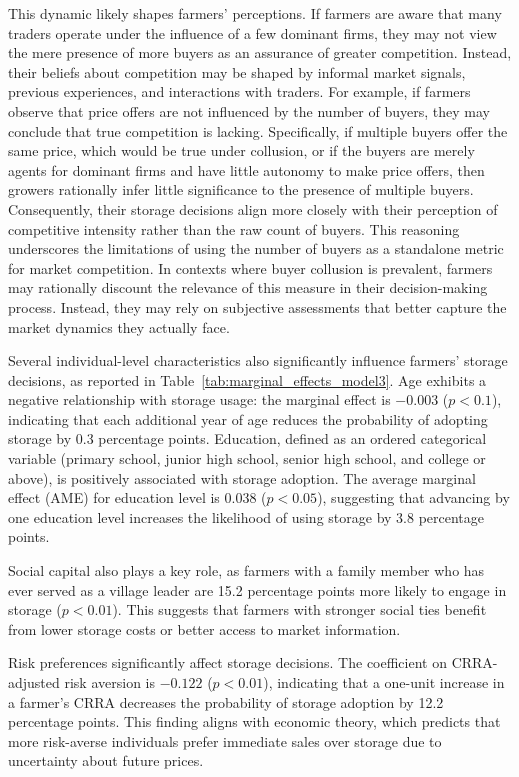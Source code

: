 This dynamic likely shapes farmers' perceptions. If farmers are aware that many traders operate under the influence of a few dominant firms, they may not view the mere presence of more buyers as an assurance of greater competition. Instead, their beliefs about competition may be shaped by informal market signals, previous experiences, and interactions with traders. For example, if farmers observe that price offers are not influenced by the number of buyers, they may conclude that true competition is lacking. Specifically, if multiple buyers offer the same price, which would be true under collusion, or if the buyers are merely agents for dominant firms and have little autonomy to make price offers, then growers rationally infer little significance to the presence of multiple buyers. Consequently, their storage decisions align more closely with their perception of competitive intensity rather than the raw count of buyers. This reasoning underscores the limitations of using the number of buyers as a standalone metric for market competition. In contexts where buyer collusion is prevalent, farmers may rationally discount the relevance of this measure in their decision-making process. Instead, they may rely on subjective assessments that better capture the market dynamics they actually face.  


Several individual-level characteristics also significantly influence farmers' storage decisions, as reported in Table~\ref{tab:marginal_effects_model3}. Age exhibits a negative relationship with storage usage: the marginal effect is $-0.003$ ($p<0.1$), indicating that each additional year of age reduces the probability of adopting storage by 0.3 percentage points. Education, defined as an ordered categorical variable (primary school, junior high school, senior high school, and college or above), is positively associated with storage adoption. The average marginal effect (AME) for education level is 0.038 ($p<0.05$), suggesting that advancing by one education level increases the likelihood of using storage by 3.8 percentage points.


Social capital also plays a key role, as farmers with a family member who has ever served as a village leader are 15.2 percentage points more likely to engage in storage ($p<0.01$). This suggests that farmers with stronger social ties benefit from lower storage costs or better access to market information.

Risk preferences significantly affect storage decisions. The coefficient on CRRA-adjusted risk aversion is $-0.122$ ($p<0.01$), indicating that a one-unit increase in a farmer's CRRA decreases the probability of storage adoption by 12.2 percentage points. This finding aligns with economic theory, which predicts that more risk-averse individuals prefer immediate sales over storage due to uncertainty about future prices.

